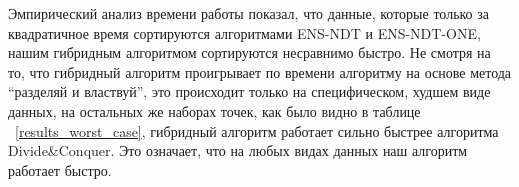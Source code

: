 Эмпирический анализ времени работы показал, что данные, которые только за квадратичное время сортируются алгоритмами ENS-NDT и ENS-NDT-ONE, нашим гибридным алгоритмом сортируются несравнимо быстро. Не смотря на то, что гибридный алгоритм проигрывает по времени алгоритму на основе метода ``разделяй и властвуй'', это происходит только на специфическом, худшем виде данных, на остальных же наборах точек, как было видно в таблице ~\ref{results_worst_case}, гибридный алгоритм работает сильно быстрее алгоритма Divide\&Conquer. Это означает, что на любых видах данных наш алгоритм работает быстро.

